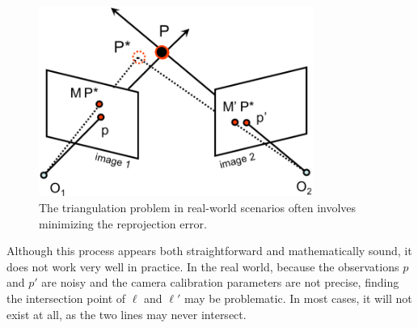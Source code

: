 \documentclass[a4paper, 12pt]{article}
\numberwithin{equation}{section}
\begin{document}
\begin{figure}[h!]
\centering
\includegraphics[width=0.8\textwidth]{figures/real_triangulation.png}
\caption{The triangulation problem in real-world scenarios often involves minimizing the reprojection error.}
\label{fig:real_triangulation}
\end{figure}

Although this process appears both straightforward and mathematically sound, it does not work very well in practice. In the real world, because the observations $p$ and $p'$ are noisy and the camera calibration parameters are not precise, finding the intersection point of $\ell$ and $\ell'$ may be problematic. In most cases, it will not exist at all, as the two lines may never intersect. 
\end{document}

